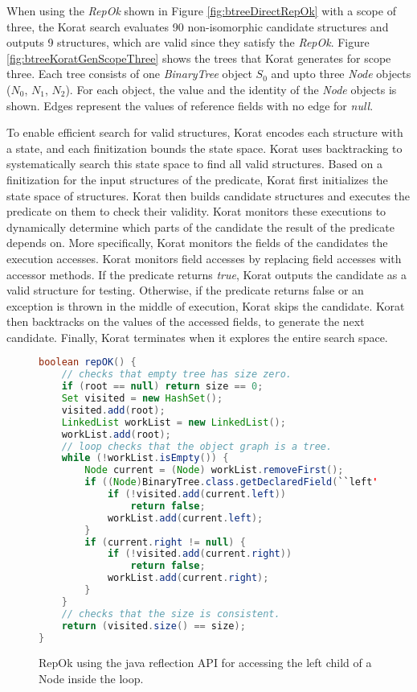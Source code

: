\para When using the \emph{RepOk} shown in Figure
\ref{fig:btreeDirectRepOk} with a scope of three, the Korat search
evaluates 90 non-isomorphic candidate structures and outputs 9
structures, which are valid since they satisfy the \emph{RepOk}.
Figure \ref{fig:btreeKoratGenScopeThree} shows the trees that Korat
generates for scope three. Each tree consists of one \emph{BinaryTree}
object $S_0$ and upto three \emph{Node} objects ($N_0$, $N_1$,
$N_2$). For each object, the value and the identity of the \emph{Node}
objects is shown. Edges represent the values of reference fields with
no edge for \emph{null}.


\para To enable efficient search for valid structures, Korat encodes
each structure with a state, and each finitization bounds the state
space. Korat uses backtracking to systematically search this state
space to find all valid structures. Based on a finitization for the
input structures of the predicate, Korat first initializes the state
space of structures. Korat then builds candidate structures and
executes the predicate on them to check their validity. Korat monitors
these executions to dynamically determine which parts of the candidate
the result of the predicate depends on. More specifically, Korat
monitors the fields of the candidates the execution accesses. Korat
monitors field accesses by replacing field accesses with accessor
methods. If the predicate returns \emph{true}, Korat outputs the
candidate as a valid structure for testing. Otherwise, if the
predicate returns false or an exception is thrown in the middle of
execution, Korat skips the candidate. Korat then backtracks on the
values of the accessed fields, to generate the next
candidate. Finally, Korat terminates when it explores the entire
search space.

\begin{figure}
\centering
\begin{lstlisting}[language=Java]
boolean repOK() {
    // checks that empty tree has size zero.
    if (root == null) return size == 0;
    Set visited = new HashSet();
    visited.add(root);
    LinkedList workList = new LinkedList();
    workList.add(root);
    // loop checks that the object graph is a tree.
    while (!workList.isEmpty()) {
        Node current = (Node) workList.removeFirst();
        if ((Node)BinaryTree.class.getDeclaredField(``left'').get(current) != null) {
            if (!visited.add(current.left)) 
                return false;
            workList.add(current.left);
        }
        if (current.right != null) {
            if (!visited.add(current.right))
                return false;
            workList.add(current.right);
        }
    }
    // checks that the size is consistent.
    return (visited.size() == size);
}
\end{lstlisting}
\caption{RepOk using the java reflection API for accessing the left child of a Node inside the loop.}
\label{fig:btTreeReflectionRepOK}
\end{figure}


